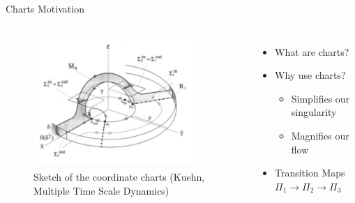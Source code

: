\documentclass[11pt]{beamer}
\begin{document}
\begin{frame}{Charts Motivation}
    \begin{columns}
    \begin{figure}
        \centering
        \includegraphics[height=5cm,width=6cm]{Charts.png}
        \caption{Sketch of the coordinate charts (Kuehn, Multiple Time Scale Dynamics)}
    \end{figure}    
        \begin{itemize}
            \item What are charts?
            \item Why use charts?
            \begin{itemize}
                \item Simplifies our singularity
                \item Magnifies our flow 
            \end{itemize}
            \item Transition Maps $\Pi_1\to \Pi_2\to \Pi_3$
        \end{itemize}

    \end{columns}
\end{frame}
\end{document}
